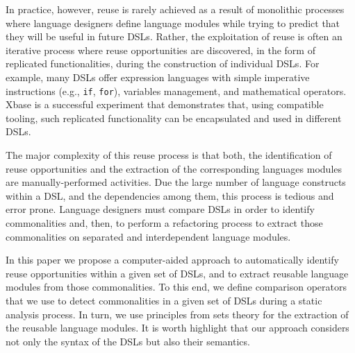In practice, however, reuse is rarely achieved as a result of monolithic processes where language designers define language modules while trying to predict that they will be useful in future DSLs. Rather, the exploitation of reuse is often an iterative process where reuse opportunities are discovered, in the form of replicated functionalities, during the construction of individual DSLs. For example, many DSLs offer expression languages with simple imperative instructions (e.g., \texttt{if}, \texttt{for}), variables management, and mathematical operators. Xbase \cite{Bettini:2013} is a successful experiment that demonstrates that, using compatible tooling, such replicated functionality can be encapsulated and used in different DSLs.

The major complexity of this reuse process is that both, the identification of reuse opportunities and the extraction of the corresponding languages modules are manually-performed activities. Due the large number of language constructs within a DSL, and the dependencies among them, this process is tedious and error prone. Language designers must compare DSLs in order to identify commonalities and, then, to perform a refactoring process to extract those commonalities on separated and interdependent language modules. %

In this paper we propose a computer-aided approach to automatically identify reuse opportunities within a given set of DSLs, and to extract reusable language modules from those commonalities. To this end, we define comparison operators that we use to detect commonalities in a given set of DSLs during a static analysis process. In turn, we use principles from sets theory for the extraction of the reusable language modules. It is worth highlight that our approach considers not only the syntax of the DSLs but also their semantics.


